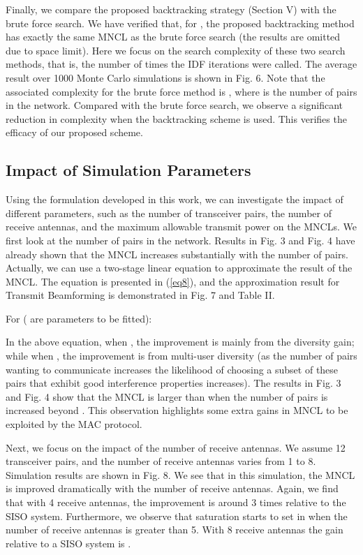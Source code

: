\documentclass[draftcls,onecolumn,peerview,12pt]{IEEEtran}
\begin{document}
Finally, we compare the proposed backtracking strategy (Section V)
with the brute force search. We have verified that, for , the proposed backtracking method has exactly the same MNCL
as the brute force search (the results are omitted due to space
limit). Here we focus on the search complexity of these two search
methods, that is, the number of times the IDF iterations were
called. The average result over 1000 Monte Carlo simulations is
shown in Fig. 6. Note that the associated complexity for the brute
force method is , where  is the number of pairs in
the network. Compared with the brute force search, we observe a
significant reduction in complexity when the backtracking scheme is
used. This verifies the efficacy of our proposed scheme.


\subsection{Impact of Simulation Parameters}
Using the formulation developed in this work, we can investigate the
impact of different parameters, such as the number of transceiver
pairs, the number of receive antennas, and the maximum allowable
transmit power on the MNCLs. We first look at the number of pairs in
the network. Results in Fig. 3 and Fig. 4 have already shown that
the MNCL increases substantially with the number of pairs. Actually,
we can use a two-stage linear equation to approximate the result of
the MNCL. The equation is presented in (\ref{eq8}), and the
approximation result for Transmit Beamforming is demonstrated in
Fig. 7 and Table II.

For  ( are parameters to
be fitted):

In the above equation, when , the improvement is mainly
from the diversity gain; while when , the
improvement is from multi-user diversity (as the number of pairs
wanting to communicate increases the likelihood of choosing a subset
of these pairs that exhibit good interference properties increases).
The results in Fig. 3 and Fig. 4 show that the MNCL is larger than
 when the number of pairs  is increased beyond . This
observation highlights some extra gains in MNCL to be exploited by
the MAC protocol.


Next, we focus on the impact of the number of receive antennas. We
assume 12 transceiver pairs, and the number of receive antennas 
varies from 1 to 8. Simulation results are shown in Fig. 8. We see
that in this simulation, the MNCL is improved dramatically with the
number of receive antennas. Again, we find that with 4 receive
antennas, the improvement is around 3 times relative to the SISO
system. Furthermore, we observe that saturation starts to set in
when the number of receive antennas is greater than 5. With 8
receive antennas the gain relative to a SISO system is .
\end{document}
